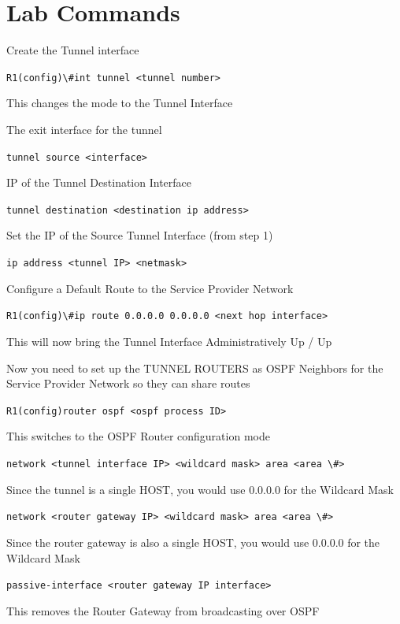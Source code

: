 \section{Lab Commands}\label{lab-commands}

Create the Tunnel interface

\passthrough{\lstinline!R1(config)\#int tunnel <tunnel number>!}

This changes the mode to the Tunnel Interface

The exit interface for the tunnel

\passthrough{\lstinline!tunnel source <interface>!}

IP of the Tunnel Destination Interface

\passthrough{\lstinline!tunnel destination <destination ip address>!}

Set the IP of the Source Tunnel Interface (from step 1)

\passthrough{\lstinline!ip address <tunnel IP> <netmask>!}

Configure a Default Route to the Service Provider Network

\passthrough{\lstinline!R1(config)\#ip route 0.0.0.0 0.0.0.0 <next hop interface>!}

This will now bring the Tunnel Interface Administratively Up / Up

Now you need to set up the TUNNEL ROUTERS as OSPF Neighbors for the
Service Provider Network so they can share routes

\passthrough{\lstinline!R1(config)router ospf <ospf process ID>!}

This switches to the OSPF Router configuration mode

\passthrough{\lstinline!network <tunnel interface IP> <wildcard mask> area <area \#>!}

Since the tunnel is a single HOST, you would use 0.0.0.0 for the
Wildcard Mask

\passthrough{\lstinline!network <router gateway IP> <wildcard mask> area <area \#>!}

Since the router gateway is also a single HOST, you would use 0.0.0.0
for the Wildcard Mask

\passthrough{\lstinline!passive-interface <router gateway IP interface>!}

This removes the Router Gateway from broadcasting over OSPF
